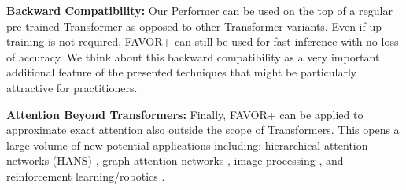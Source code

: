 \textbf{Backward Compatibility:} Our Performer can be used on the top of a regular pre-trained Transformer as opposed to other Transformer variants. Even if up-training is not required, FAVOR+ can still be used for fast inference with no loss of accuracy. We think about this backward compatibility as a very important additional feature of the presented techniques that might be particularly attractive for practitioners.

\textbf{Attention Beyond Transformers:} Finally, FAVOR+ can be applied to approximate exact attention also outside the scope of Transformers. This opens a large volume of new potential applications including: hierarchical attention networks (HANS) \citep{hans}, graph attention networks \citep{gran}, image processing \citep{attention_cvpr}, and reinforcement learning/robotics \citep{tang}. 



